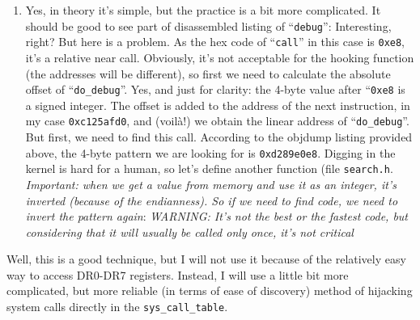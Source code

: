 \documentclass[12pt]{article}
\begin{document}
\begin{enumerate}
   \item Yes, in theory it's simple, but the practice is a bit more
     complicated. It should be good to see part of disassembled
     listing of ``\verb!debug!'':
      Interesting, right? But here is a
     problem. As the hex code of ``\verb!call!'' in this case is
     \verb!0xe8!, it's a relative near call. Obviously, it's not
     acceptable for the hooking function (the addresses will be
     different), so first we need to calculate the absolute offset of
     ``\verb!do_debug!''. Yes, and just for clarity: the 4-byte value
     after ``\verb!0xe8! is a signed integer. The offset is added to
     the address of the next instruction, in my case
     \verb!0xc125afd0!, and (voilà!) we obtain the linear address of
     ``\verb!do_debug!''. But first, we need to find this
     call. According to the objdump listing provided above, the 4-byte
     pattern we are looking for is \verb!0xd289e0e8!. Digging in the
     kernel is hard for a human, so let's define another function
     (file \verb!search.h!.  \emph{Important: when we get a value from
       memory and use it as an integer, it's inverted (because of the
       endianness). So if we need to find code, we need to invert the
       pattern again}:  \emph{WARNING: It's
       not the best or the fastest code, but considering that it will
       usually be called only once, it's not critical}
  \end{enumerate}
  Well, this is a good technique, but I will not use it because of the
  relatively easy way to access DR0-DR7 registers. Instead, I will use a
  little bit more complicated, but more reliable (in terms of ease of
  discovery) method of hijacking system calls directly in the
  \verb!sys_call_table!.
\end{document}
